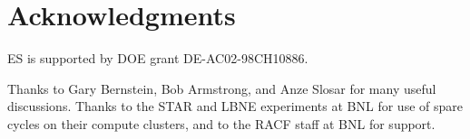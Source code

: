 \documentclass[12pt,preprint]{aastex}
\begin{document}
\section*{Acknowledgments}

ES is supported by DOE grant DE-AC02-98CH10886.

Thanks to Gary Bernstein, Bob Armstrong, and Anze Slosar for many useful
discussions.  Thanks to the STAR and LBNE experiments at BNL for use of spare
cycles on their compute clusters, and to the RACF staff at BNL for support.




\end{document}
